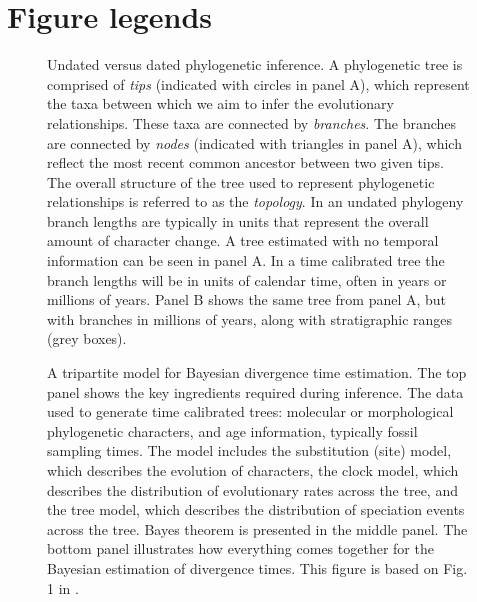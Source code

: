 \documentclass{cup-elements}
\begin{document}
\clearpage

\section*{Figure legends}

\begin{figure}[h!]
\centering
\label{fig:undated}
\caption{Undated versus dated phylogenetic inference.
A phylogenetic tree is comprised of \textit{tips} (indicated with circles in panel A), which represent the taxa between which we aim to infer the evolutionary relationships.
These taxa are connected by \textit{branches}. 
The branches are connected by \textit{nodes} (indicated with triangles in panel A), which reflect the most recent common ancestor between two given tips. 
The overall structure of the tree used to represent phylogenetic relationships is referred to as the \textit{topology}.
In an undated phylogeny branch lengths are typically in units that represent the overall amount of character change.
A tree estimated with no temporal information can be seen in panel A.
In a time calibrated tree the branch lengths will be in units of calendar time, often in years or millions of years. 
Panel B shows the same tree from panel A, but with branches in millions of years, along with stratigraphic ranges (grey boxes).}
\label{fig:undated}
\end{figure}

\begin{figure}[h!]
\centering
\caption{A tripartite model for Bayesian divergence time estimation.
The top panel shows the key ingredients required during inference.
The data used to generate time calibrated trees: molecular or morphological phylogenetic characters, and age information, typically fossil sampling times.
The model includes the substitution (site) model, which describes the evolution of characters, the clock model, which describes the distribution of evolutionary rates across the tree, and the tree model, which describes the distribution of speciation events across the tree.
Bayes theorem is presented in the middle panel. 
The bottom panel illustrates how everything comes together for the Bayesian estimation of divergence times.
This figure is based on Fig. 1 in \citep{duPlessis2015}.
}
\label{fig:bayes}
\end{figure}
\end{document}
